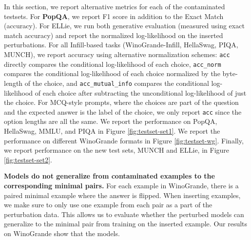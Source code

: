 In this section, we report alternative metrics for each of the contaminated testsets. For \textbf{PopQA}, we report F1 score \citet{rajpurkar-etal-2018-know} in addition to the Exact Match (accuracy). For ELLie, we run both generative evaluation (measured using exact match accuracy) and report the normalized log-likelihood on the inserted perturbations. For all Infill-based tasks (WinoGrande-Infill, HellaSwag, PIQA, MUNCH), we report accuracy using alternative normalization schemes: \texttt{acc} directly compares the conditional log-likelihood of each choice, \texttt{acc\_norm} compares the conditional log-likelihood of each choice normalized by the byte-length of the choice, and \texttt{acc\_mutual\_info} compares the conditional log-likelihood of each choice after subtracting the unconditional log-likelihood of just the choice. For MCQ-style prompts, where the choices are part of the question and the expected answer is the label of the choice, we only report \texttt{acc} since the option lengths are all the same. We report the performance on PopQA, HellaSwag, MMLU, and PIQA in Figure \ref{fig:testset-set1}. We report the performance on different WinoGrande formats in Figure \ref{fig:testset-wg}. Finally, we report performance on the new test sets, MUNCH and ELLie, in Figure \ref{fig:testset-set2}.




\textbf{Models do not generalize from contaminated examples to the corresponding minimal pairs.} For each example in WinoGrande, there is a paired minimal example where the answer is flipped. When inserting examples, we make sure to only use one example from each pair as a part of the perturbation data. This allows us to evaluate whether the perturbed models can generalize to the minimal pair from training on the inserted example. Our results on WinoGrande show that the models.

